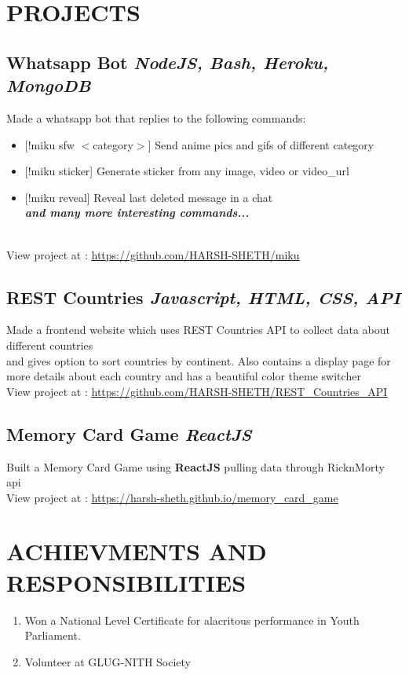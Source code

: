 \documentclass[12pt]{article}
\begin{document}
\section{PROJECTS}
\subsection*{Whatsapp Bot \hfill \normalsize \textit{NodeJS, Bash, Heroku, MongoDB}}
  \parbox{\textwidth}{ Made a whatsapp bot that replies to the following commands:   
  \begin{itemize}
    \item{[!miku sfw $<$category$>$] Send anime pics and gifs of different category}
    \item{[!miku sticker] Generate sticker from any image, video or video\_url }
    \item{[!miku reveal] Reveal last deleted message in a chat}
      \\ \emph{\textbf{and many more interesting commands...}}
  \end{itemize}
  \\ View project at : \underline{\url{https://github.com/HARSH-SHETH/miku}}
  }
\subsection*{REST Countries \hfill \normalsize \textit{Javascript, HTML, CSS, API}}
  \parbox{\textwidth}{ Made a frontend website which uses REST Countries API to collect data about different countries\\
   and gives option to sort countries by continent. Also contains a display page for more details about each country and has a beautiful color theme switcher\\
   View project at : \underline{\url{https://github.com/HARSH-SHETH/REST_Countries_API}}
  }

\subsection*{Memory Card Game \hfill \normalsize \textit{ReactJS}}
\parbox{\textwidth}{ Built a Memory Card Game using \textbf{ReactJS} pulling data through RicknMorty api
\\ View project at : \underline{\url{https://harsh-sheth.github.io/memory_card_game}}
}
\section{ACHIEVMENTS AND RESPONSIBILITIES}
\begin{enumerate}
  \item Won a National Level Certificate for alacritous performance in Youth Parliament.
  \item Volunteer at GLUG-NITH Society
\end{enumerate}

\end{document}
